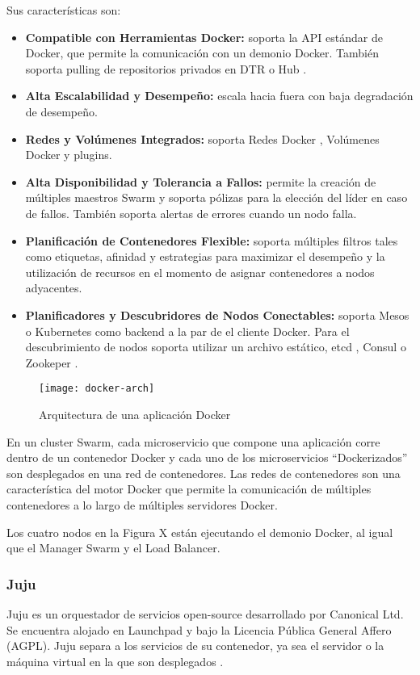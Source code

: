 Sus características son:
\begin{itemize}
\item \textbf{Compatible con Herramientas Docker: } soporta la API estándar de Docker, que permite la comunicación con un demonio Docker. También soporta pulling de repositorios privados en DTR  \parencite{Docker2016-is} o Hub \parencite{Docker2016-ev}.
\item \textbf{Alta Escalabilidad y Desempeño: }escala hacia fuera con baja degradación de desempeño. 
\item \textbf{Redes y Volúmenes Integrados: }soporta Redes Docker \parencite{Docker2016-dm}, Volúmenes Docker \parencite{Docker2016-mi} y plugins.
\item \textbf{Alta Disponibilidad y Tolerancia a Fallos: }permite la creación de múltiples maestros Swarm y soporta pólizas para la elección del líder en caso de fallos. También soporta alertas de errores cuando un nodo falla.
\item \textbf{Planificación de Contenedores Flexible: }soporta múltiples filtros tales como etiquetas, afinidad y estrategias para maximizar el desempeño y la utilización de recursos en el momento de asignar contenedores a nodos adyacentes.
\item \textbf{Planificadores y Descubridores de Nodos Conectables: }soporta Mesos o Kubernetes como backend a la par de el cliente Docker. Para el descubrimiento de nodos soporta utilizar un archivo estático, etcd \parencite{Coreos2016-ep}, Consul \parencite{HashiCorp2016-ei} o Zookeper \parencite{Apache2016-oo}.

\end{itemize}

\begin{figure}[H]
    \centering
    \texttt{[image: docker-arch]}
    \caption{ Arquitectura de una aplicación Docker \parencite{Docker2016-pk}}
    \label{fig:docker-arch}
\end{figure}
En un cluster Swarm, cada microservicio que compone una aplicación corre dentro de un contenedor Docker y cada uno de los microservicios “Dockerizados” son desplegados en una red de contenedores. Las redes de contenedores son una característica del motor Docker que permite la comunicación de múltiples contenedores a lo largo de múltiples servidores Docker. 

Los cuatro nodos en la Figura X están ejecutando el demonio Docker, al igual que el Manager Swarm y el Load Balancer.


\subsubsection{Juju}
Juju es un orquestador de servicios open-source desarrollado por Canonical Ltd. Se encuentra alojado en Launchpad y bajo la Licencia Pública General Affero (AGPL). Juju separa a los servicios de su contenedor, ya sea el servidor o la máquina virtual en la que son desplegados \parencite{Canonical2016-qx}. 

